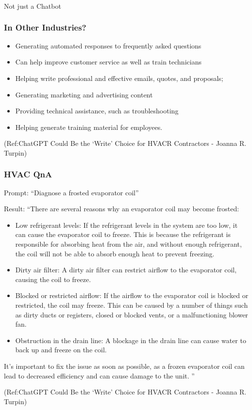 \begin{frame}[fragile]\frametitle{}
\begin{center}
{\Large Not just a Chatbot}
\end{center}
\end{frame}

\begin{frame}[fragile]\frametitle{In Other Industries?}


\begin{itemize}
\item Generating automated responses to frequently asked questions 
\item Can help improve customer service as well as
train technicians
\item Helping write professional and effective emails, quotes, and proposals;
\item Generating marketing and advertising content
\item Providing technical assistance, such as troubleshooting
\item Helping generate training material for employees.
\end{itemize}	 

\tiny{(Ref:ChatGPT Could Be the ‘Write’ Choice for HVACR Contractors - Joanna R. Turpin)}
\end{frame}


\begin{frame}[fragile]\frametitle{HVAC QnA}
Prompt: ``Diagnose a frosted evaporator coil''

Result: 
``There are several reasons why an evaporator coil may become frosted:
\begin{itemize}
\item Low refrigerant levels: If the refrigerant levels in the system are too low, it can cause the
evaporator coil to freeze. This is because the refrigerant is responsible for absorbing heat
from the air, and without enough refrigerant, the coil will not be able to absorb enough heat
to prevent freezing.
\item Dirty air filter: A dirty air filter can restrict airflow to the evaporator coil, causing the coil
to freeze.
\item Blocked or restricted airflow: If the airflow to the evaporator coil is blocked or
restricted, the coil may freeze. This can be caused by a number of things such as dirty ducts or
registers, closed or blocked vents, or a malfunctioning blower fan.
\item Obstruction in the drain line: A blockage in the drain line can cause water to back up and freeze on the coil.
\end{itemize}	 
It's important to fix the issue as soon as possible, as a frozen evaporator coil can lead to decreased
efficiency and can cause damage to the unit.
''

\tiny{(Ref:ChatGPT Could Be the ‘Write’ Choice for HVACR Contractors - Joanna R. Turpin)}
\end{frame}

